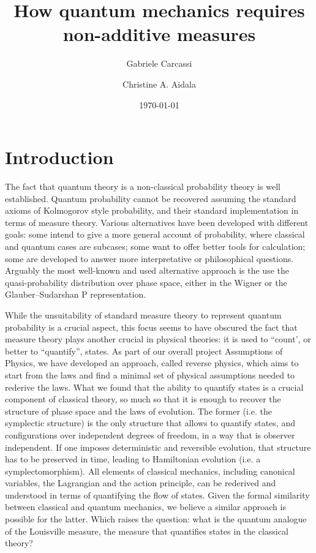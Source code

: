 \documentclass[10pt,twocolumn, nofootinbib]{revtex4-2}
\begin{document}
\title{How quantum mechanics requires non-additive measures}
\author{Gabriele Carcassi}
\author{Christine A. Aidala}

\date{\today}


\begin{abstract}
\end{abstract}

\maketitle

\section{Introduction}

The fact that quantum theory is a non-classical probability theory is well established. Quantum probability cannot be recovered assuming the standard axioms of Kolmogorov style probability, and their standard implementation in terms of measure theory. Various alternatives have been developed with different goals: some intend to give a more general account of probability, where classical and quantum cases are subcases; some want to offer better tools for calculation; some are developed to answer more interpretative or philosophical questions. Arguably the most well-known and used alternative approach is the use the quasi-probability distribution over phase space, either in the Wigner or the Glauber–Sudarshan P representation.

While the unsuitability of standard measure theory to represent quantum probability is a crucial aspect, this focus seems to have obscured the fact that measure theory plays another crucial in physical theories: it is used to ``count', or better to ``quantify'', states. As part of our overall project Assumptions of Physics, we have developed an approach, called reverse physics, which aims to start from the laws and find a minimal set of physical assumptions needed to rederive the laws. What we found that the ability to quantify states is a crucial component of classical theory, so much so that it is enough to recover the structure of phase space and the laws of evolution. The former (i.e. the symplectic structure) is the only structure that allows to quantify states, and configurations over independent degrees of freedom, in a way that is observer independent. If one imposes deterministic and reversible evolution, that structure has to be preserved in time, leading to Hamiltonian evolution (i.e. a symplectomorphism). All elements of classical mechanics, including canonical variables, the Lagrangian and the action principle, can be rederived and understood in terms of quantifying the flow of states. Given the formal similarity between classical and quantum mechanics, we believe a similar approach is possible for the latter. Which raises the question: what is the quantum analogue of the Louisville measure, the measure that quantifies states in the classical theory?
\end{document}
